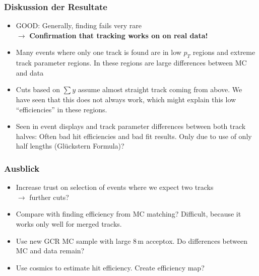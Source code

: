 \documentclass[18pt]{beamer}
\begin{document}
\begin{frame}
  \frametitle{Diskussion der Resultate}
  \begin{itemize}
  \item GOOD: Generally, finding fails very rare\\
    $\rightarrow$  \textbf{Confirmation that tracking works on on real data!}
  \item Many events where only one track is found are in low $p_T$ regions and extreme track parameter regions.
    In these regions are large differences between MC and data
  \item Cuts based on $\sum y$ assume almost straight track coming from above. We have seen that this does not always work, which might explain this low ``efficiencies'' in these regions.
  \item Seen in event displays and track parameter differences between both track halves:
    Often bad hit efficiencies and bad fit results. Only due to use of only half lengths (Glückstern Formula)?
  \end{itemize}
  
\end{frame}

\begin{frame}
  \frametitle{Ausblick}\label{lastbeforebackup}
  \begin{itemize}
  \item Increase trust on selection of events where we expect two tracks
    \\$\rightarrow$ further cuts?
  \item Compare with finding efficiency from MC matching? Difficult, because it works only well for merged tracks.
  \item Use new GCR MC sample with large 8\,m acceptox. Do differences between MC and data remain?
  \item Use cosmics to estimate hit efficiency. Create efficiency map?
  \end{itemize}
\end{frame}

  
\end{document}
